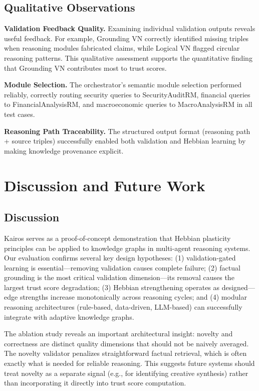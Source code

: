 \documentclass{article}
\begin{document}
\subsection{Qualitative Observations}

\textbf{Validation Feedback Quality.} Examining individual validation outputs reveals useful feedback. For example, Grounding VN correctly identified missing triples when reasoning modules fabricated claims, while Logical VN flagged circular reasoning patterns. This qualitative assessment supports the quantitative finding that Grounding VN contributes most to trust scores.

\textbf{Module Selection.} The orchestrator's semantic module selection performed reliably, correctly routing security queries to SecurityAuditRM, financial queries to FinancialAnalysisRM, and macroeconomic queries to MacroAnalysisRM in all test cases.

\textbf{Reasoning Path Traceability.} The structured output format (reasoning path + source triples) successfully enabled both validation and Hebbian learning by making knowledge provenance explicit.

\section{Discussion and Future Work}
\label{sec:discussion}

\subsection{Discussion}

Kairos serves as a proof-of-concept demonstration that Hebbian plasticity principles can be applied to knowledge graphs in multi-agent reasoning systems. Our evaluation confirms several key design hypotheses: (1) validation-gated learning is essential—removing validation causes complete failure; (2) factual grounding is the most critical validation dimension—its removal causes the largest trust score degradation; (3) Hebbian strengthening operates as designed—edge strengths increase monotonically across reasoning cycles; and (4) modular reasoning architectures (rule-based, data-driven, LLM-based) can successfully integrate with adaptive knowledge graphs.

The ablation study reveals an important architectural insight: novelty and correctness are distinct quality dimensions that should not be naively averaged. The novelty validator penalizes straightforward factual retrieval, which is often exactly what is needed for reliable reasoning. This suggests future systems should treat novelty as a separate signal (e.g., for identifying creative synthesis) rather than incorporating it directly into trust score computation.
\end{document}

